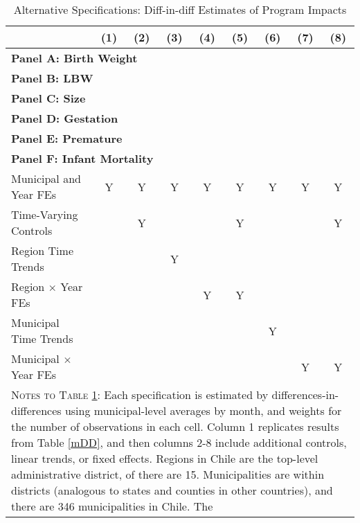 \documentclass[12pt]{article}
\begin{document}
\begin{spacing}{1.4}
\begin{landscape}
\begin{table}[htpb!]
  \begin{center}
    \caption{Alternative Specifications: Diff-in-diff Estimates of Program Impacts}
    \label{tab:AltSpecs}
    \begin{tabular}{lcccccccc} \toprule
      &(1)&(2)&(3)&(4)&(5)&(6)&(7)&(8)\\ \midrule
      \multicolumn{9}{l}{\textbf{Panel A: Birth Weight}} \\
      
      \multicolumn{9}{l}{\textbf{Panel B: LBW}} \\
      
      \multicolumn{9}{l}{\textbf{Panel C: Size}} \\
      
      \multicolumn{9}{l}{\textbf{Panel D: Gestation}} \\
      
      \multicolumn{9}{l}{\textbf{Panel E: Premature}} \\
      
      \multicolumn{9}{l}{\textbf{Panel F: Infant Mortality}} \\
      
      \midrule
      Municipal and Year FEs      & Y & Y & Y & Y & Y & Y & Y & Y \\
      Time-Varying Controls       &   & Y &   &   & Y &   &   & Y \\  
      Region Time Trends          &   &   & Y &   &   &   &   &   \\
      Region $\times$ Year FEs    &   &   &   & Y & Y &   &   &   \\
      Municipal Time Trends       &   &   &   &   &   & Y &   &   \\
      Municipal $\times$ Year FEs &   &   &   &   &   &   & Y & Y \\
      \bottomrule
      \multicolumn{9}{p{22cm}}{{\footnotesize \textsc{Notes to Table \ref{tab:AltSpecs}}:
          Each specification is estimated by differences-in-differences using
          municipal-level averages by month, and weights for the number of observations
          in each cell.  Column 1 replicates results from Table \ref{mDD}, and then
          columns 2-8 include additional controls, linear trends, or fixed effects.
          Regions in Chile are the top-level administrative district, of there are
          15.  Municipalities are within districts (analogous to states and counties
          in other countries), and there are 346 municipalities in Chile.  The
}}
\end{tabular}
\end{center}
\end{table}
\end{landscape}
\end{spacing}
\end{document}
